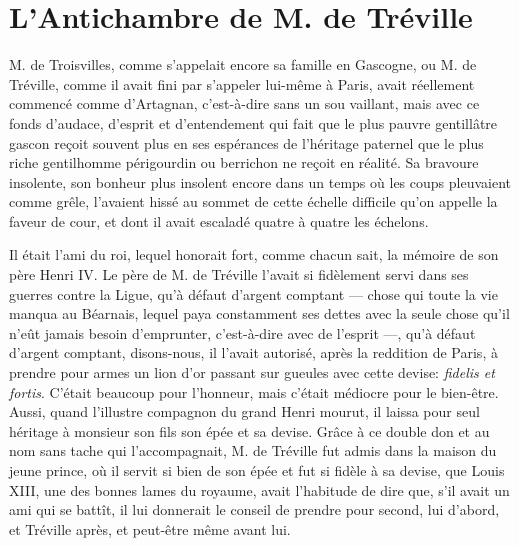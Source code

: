 
\chapter{L'Antichambre de M. de Tréville}

\lettrine{M}{.} de Troisvilles, comme s'appelait encore sa famille en Gascogne, ou M. de Tréville, comme il avait fini par s'appeler lui-même à Paris, avait réellement commencé comme d'Artagnan, c'est-à-dire sans un sou vaillant, mais avec ce fonds d'audace, d'esprit et d'entendement qui fait que le plus pauvre gentillâtre gascon reçoit souvent plus en ses espérances de l'héritage paternel que le plus riche gentilhomme périgourdin ou berrichon ne reçoit en réalité. Sa bravoure insolente, son bonheur plus insolent encore dans un temps où les coups pleuvaient comme grêle, l'avaient hissé au sommet de cette échelle difficile qu'on appelle la faveur de cour, et dont il avait escaladé quatre à quatre les échelons. 

Il était l'ami du roi, lequel honorait fort, comme chacun sait, la mémoire de son père Henri IV. Le père de M. de Tréville l'avait si fidèlement servi dans ses guerres contre la Ligue, qu'à défaut d'argent comptant --- chose qui toute la vie manqua au Béarnais, lequel paya constamment ses dettes avec la seule chose qu'il n'eût jamais besoin d'emprunter, c'est-à-dire avec de l'esprit ---, qu'à défaut d'argent comptant, disons-nous, il l'avait autorisé, après la reddition de Paris, à prendre pour armes un lion d'or passant sur gueules avec cette devise: \textit{fidelis et fortis}. C'était beaucoup pour l'honneur, mais c'était médiocre pour le bien-être. Aussi, quand l'illustre compagnon du grand Henri mourut, il laissa pour seul héritage à monsieur son fils son épée et sa devise. Grâce à ce double don et au nom sans tache qui l'accompagnait, M. de Tréville fut admis dans la maison du jeune prince, où il servit si bien de son épée et fut si fidèle à sa devise, que Louis XIII, une des bonnes lames du royaume, avait l'habitude de dire que, s'il avait un ami qui se battît, il lui donnerait le conseil de prendre pour second, lui d'abord, et Tréville après, et peut-être même avant lui. 

